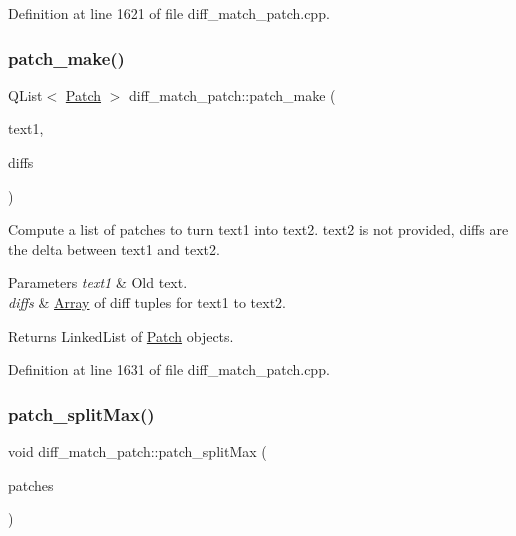 Definition at line 1621 of file diff\+\_\+match\+\_\+patch.\+cpp.

\mbox{\label{classdiff__match__patch_a7fe185270bdffc221bd36f3f72635298}} 
\subsubsection{\texorpdfstring{patch\+\_\+make()}{patch\_make()}\hspace{0.1cm}{\footnotesize\ttfamily [4/4]}}
{\footnotesize\ttfamily Q\+List$<$ \hyperlink{class_patch}{Patch} $>$ diff\+\_\+match\+\_\+patch\+::patch\+\_\+make (\begin{DoxyParamCaption}\item[{const Q\+String \&}]{text1,  }\item[{const Q\+List$<$ \hyperlink{class_diff}{Diff} $>$ \&}]{diffs }\end{DoxyParamCaption})}

Compute a list of patches to turn text1 into text2. text2 is not provided, diffs are the delta between text1 and text2. 
\begin{DoxyParams}{Parameters}
{\em text1} & Old text. \\
\hline
{\em diffs} & \hyperlink{class_array}{Array} of diff tuples for text1 to text2. \\
\hline
\end{DoxyParams}
\begin{DoxyReturn}{Returns}
Linked\+List of \hyperlink{class_patch}{Patch} objects. 
\end{DoxyReturn}


Definition at line 1631 of file diff\+\_\+match\+\_\+patch.\+cpp.

\mbox{\label{classdiff__match__patch_a8b026488adde70dcc268fc50d170f4e3}} 
\subsubsection{\texorpdfstring{patch\+\_\+split\+Max()}{patch\_splitMax()}}
{\footnotesize\ttfamily void diff\+\_\+match\+\_\+patch\+::patch\+\_\+split\+Max (\begin{DoxyParamCaption}\item[{Q\+List$<$ \hyperlink{class_patch}{Patch} $>$ \&}]{patches }\end{DoxyParamCaption})}


